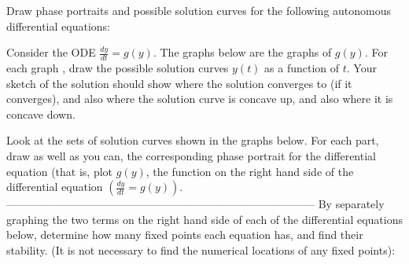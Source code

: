 \documentclass[addpoints, 11pt]{exam}
\newcommand{\ds}{\displaystyle}
\begin{document}
\begin{questions}
\question Draw phase portraits and possible solution curves for the following autonomous differential equations:
\question   Consider the ODE $\ds \frac{dy}{dt}=g(y)$. The graphs below are the graphs of $g(y)$. For each graph , draw the possible solution curves $y(t)$ as a function of $t$. Your sketch of the solution should show where the solution converges to (if it converges), and also where the solution curve is concave up, and also where it is concave down.

\question Look at the sets of solution curves shown in the graphs below. For each part, draw as well as you can, the corresponding phase portrait for the differential equation (that is, plot $g(y)$, the function on the right hand side of the differential equation $\left(\frac{d y}{d t}=g(y)\right)$.
------------------------------------------------------------------------------------
\question By separately graphing the two terms on the right hand side of each of the differential equations below, determine how many fixed points each equation has, and find their stability. (It is not necessary to find the numerical locations of any fixed points):
\begin{parts}

\end{parts}
\end{questions}
\end{document}
